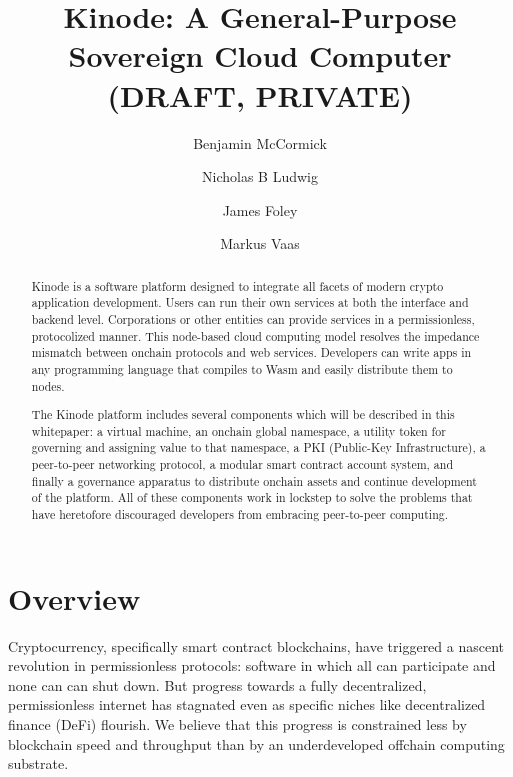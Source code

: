 \documentclass[runningheads]{llncs}
\begin{document}
%
\title{Kinode: A General-Purpose Sovereign Cloud Computer (DRAFT, PRIVATE)}
%
%
\author{
Benjamin McCormick \and
Nicholas B Ludwig \and
James Foley \and
Markus Vaas
}
%
\maketitle %
%
\begin{abstract}
Kinode is a software platform designed to integrate all facets of modern crypto application development.
Users can run their own services at both the interface and backend level.
Corporations or other entities can provide services in a permissionless, protocolized manner.
This node-based cloud computing model resolves the impedance mismatch between onchain protocols and web services.
Developers can write apps in any programming language that compiles to Wasm and easily distribute them to nodes.

The Kinode platform includes several components which will be described in this whitepaper: a virtual machine, an onchain global namespace, a utility token for governing and assigning value to that namespace, a PKI (Public-Key Infrastructure), a peer-to-peer networking protocol, a modular smart contract account system, and finally a governance apparatus to distribute onchain assets and continue development of the platform.
All of these components work in lockstep to solve the problems that have heretofore discouraged developers from embracing peer-to-peer computing.

\end{abstract}
%
\tableofcontents
%
%
%
%
\section{Overview}
\label{sec:overview}

Cryptocurrency, specifically smart contract blockchains, have triggered a nascent revolution in permissionless protocols: software in which all can participate and none can can shut down.
But progress towards a fully decentralized, permissionless internet has stagnated even as specific niches like decentralized finance (DeFi) flourish.
We believe that this progress is constrained less by blockchain speed and throughput than by an underdeveloped offchain computing substrate.
\end{document}

